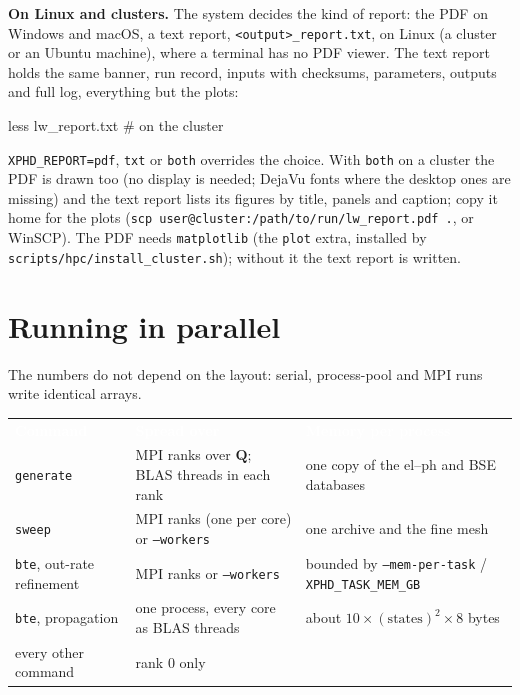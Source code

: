 \documentclass[10pt,a4paper]{article}
\newcommand{\hd}[1]{\textcolor{white}{\normalfont\bfseries #1}}
\newcommand{\hdrow}{\rowcolor{accent}}
\newcommand{\bQ}{\mathbf{Q}}
\begin{document}
\textbf{On Linux and clusters.} The system decides the kind of report: the PDF on Windows and macOS, a text report,
\texttt{<output>\_report.txt}, on Linux (a cluster or an Ubuntu machine), where a terminal has no PDF viewer. The text
report holds the same banner, run record, inputs with checksums, parameters, outputs and full log, everything but the plots:
\begin{cmd}
less lw_report.txt                                  # on the cluster
\end{cmd}
\texttt{XPHD\_REPORT=pdf}, \texttt{txt} or \texttt{both} overrides the choice. With \texttt{both} on a cluster the PDF is drawn too
(no display is needed; DejaVu fonts where the desktop ones are missing) and the text report lists its figures by title, panels
and caption; copy it home for the plots (\texttt{scp user@cluster:/path/to/run/lw\_report.pdf .}, or WinSCP). The PDF needs
\texttt{matplotlib} (the \texttt{plot} extra, installed by \texttt{scripts/hpc/install\_cluster.sh}); without it the text report is written.

\section{Running in parallel}
The numbers do not depend on the layout: serial, process-pool and MPI runs write identical arrays.

{\small\renewcommand{\arraystretch}{1.2}
\begin{tabularx}{\linewidth}{>{\raggedright\arraybackslash}p{3.6cm}>{\raggedright\arraybackslash}p{5.4cm}>{\raggedright\arraybackslash}X}
\hdrow \hd{Command} & \hd{Spread over} & \hd{Memory per process}\\
\texttt{generate} & MPI ranks over $\bQ$; BLAS threads in each rank & one copy of the el--ph and BSE databases\\
\texttt{sweep} & MPI ranks (one per core) or \texttt{--workers} & one archive and the fine mesh\\
\texttt{bte}, out-rate refinement & MPI ranks or \texttt{--workers} & bounded by \texttt{--mem-per-task} / \texttt{XPHD\_TASK\_MEM\_GB}\\
\texttt{bte}, propagation & one process, every core as BLAS threads & about $10\times(\text{states})^2\times8$ bytes\\
every other command & rank 0 only & \\
\end{tabularx}}
\end{document}
